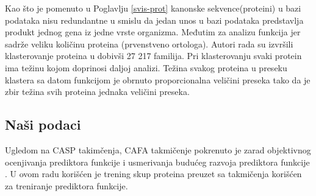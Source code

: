 Kao što je pomenuto u Poglavlju \ref{svis-prot} kanonske sekvence(proteini) u \swissprot
bazi podataka nisu redundantne u smislu da jedan unos u bazi podataka predstavlja produkt
jednog gena iz jedne vrste organizma. Međutim za analizu funkcija
\swissprot {} \parencite{proveriti} jer
sadrže veliku količinu  proteina (prvenstveno ortologa).
Autori rada \parencite{Xie2007} su izvršili klasterovanje \swissprot
proteina u  dobivši 27 217 familija. Pri klasterovanju svaki protein
ima težinu kojom doprinosi daljoj analizi. Težina svakog proteina u preseku
klastera sa datom funkcijom je obrnuto proporcionalna veličini preseka
tako da je zbir težina svih proteina jednaka veličini preseka.

%

\subsection{Naši podaci}

Ugledom na CASP takimčenja, CAFA 
takmičenje pokrenuto je zarad objektivnog ocenjivanja prediktora funkcije i
usmerivanja budućeg razvoja prediktora funkcije \parencite{CAFA}.
U ovom radu korišćen je trening skup proteina preuzet sa  takmičenja
korišćen za treniranje prediktora funkcije.

